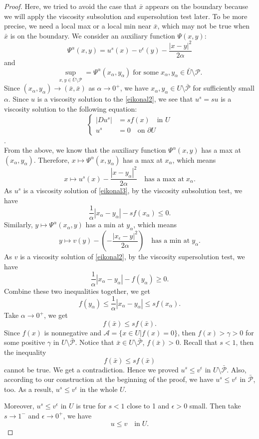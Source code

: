 \documentclass[10pt,a4paper]{amsart}
\begin{document}
\begin{proof}
Here, we tried to avoid the case that $\bar x$ appears on the boundary because we will apply the viscosity subsolution and supersolution test later.
To be more precise, we need a local max or a local min near $\bar x$, which may not be true when $\bar x$ is on the boundary.
We consider an auxiliary function $\Psi(x,y) $:
\[
    \Psi^{\alpha}(x,y)=u^{s}(x)-v^{\epsilon}(y)-\frac{|x-y|^2}{2\alpha}
\]
and
\[
    \sup_{x,y\in \bar{U}\setminus\mathcal{P}}=\Psi ^{\alpha}(x_\alpha,y_\alpha) \; \text{for some} \; x_\alpha,y_\alpha \in \bar{U}\setminus\mathcal{P}.
\]
Since $(x_\alpha, y_\alpha) \rightarrow (\bar{x}, \bar{x})$ as $\alpha \rightarrow 0^+$, we have $x_\alpha, y_\alpha \in U \setminus \bar{\mathcal{P}}$ for sufficiently small $\alpha$.
Since $u$ is a viscosity solution to the \eqref{eikonal2}, we see that $u^s = su$ is a viscosity solution to the following equation:\\
\begin{equation}\label{eikonal3}
\left\{
\begin{aligned}
|Du^s| &= sf(x) \quad \text{in } U \\
u^s &= 0 \quad \text{on } \partial U
\end{aligned} 
\right.    
\end{equation}.\\
From the above, we know that the auxiliary function $\Psi^{\alpha}(x,y)$ has a max at $(x_\alpha,y_\alpha)$. Therefore, $x\mapsto \Psi^\alpha(x,y_\alpha)$ has a max at $x_\alpha$, which means
\[
    x\mapsto u^s (x)-\frac{|x-y_\alpha|^2}{2\alpha} \quad \text{has a max at} \; x_\alpha.
\]
As $u^s$ is a viscosity solution of \eqref{eikonal3}, by the viscosity subsolution test, we have 
\[
    \frac{1}{\alpha}|x_\alpha-y_\alpha|-sf(x_\alpha)\le0.
\]
Similarly, $y\mapsto \Psi^\alpha (x_\alpha,y)$ has a min at $y_\alpha$, which means 
\[
    y\mapsto v(y)-(-\frac{|x_\epsilon-y|^2}{2\alpha})\quad \text{has a min at} \; y_\alpha.
\]
As $v$ is a viscosity solution of \eqref{eikonal2}, by the viscosity supersolution test, we have 
\[
    \frac{1}{\alpha}|x_\alpha-y_\alpha|-f(y_\alpha)\ge0.
\]
Combine these two inequalities together, we get 
\[
    f(y_\alpha)\le \frac{1}{\alpha}|x_\alpha - y_\alpha|\le sf(x_\alpha).
\]
Take $\alpha \rightarrow 0^+$, we get 
\[
    f(\bar{x})\le sf(\bar{x}).
\]
Since $f(x)$ is nonnegative and  $\mathcal{A}=\{x\in U|f(x)=0\}$, then $f(x)>\gamma>0$ for some positive $\gamma$ in $U\setminus \bar{\mathcal{P}}$. Notice that  $\bar{x}\in U\setminus \bar{\mathcal{P}}$, $f(\bar{x})>0$. Recall that $s<1$, then the inequality 
\[
    f(\bar{x})\le sf(\bar{x})
\]
cannot be true. We get a contradiction. Hence we proved $u^s\le v^{\epsilon}$ in $U\setminus{\bar{\mathcal{P}}}$. 
Also, according to our construction at the beginning of the proof, we have $u^s\le v^\epsilon$ in $\mathcal{\bar{P}}$, too. As a result, $u^s\le v^\epsilon$ in the whole $U$. 

Moreover, $u^s\le v^\epsilon$ in $U$ is true for $s<1$ close to 1 and $\epsilon>0$ small. Then take $s\rightarrow 1^-$ and $\epsilon \rightarrow 0^+$, we have
\[
    u\le v \quad \text{in}\; U.
\]
\end{proof}
\end{document}
